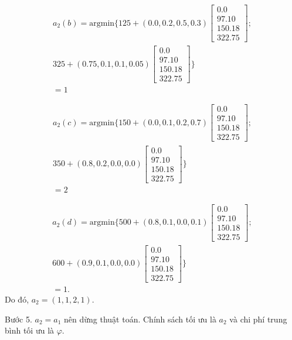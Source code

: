 \documentclass[12pt,a4paper]{report}
\begin{document}
\begin{align*}
a_2(b)=\mathrm{argmin}\{125+(0.0,0.2, 0.5,0.3)
\left[
\begin{array}{c}
0.0\\
97.10\\
150.18\\
322.75
\end{array}
\right];\\
325+(0.75,0.1,0.1,0.05)
\left[
\begin{array}{c}
0.0\\
97.10\\
150.18\\
322.75
\end{array}
\right]\}\\
=1
\end{align*}

\begin{align*}
a_2(c)=\mathrm{argmin}\{150+(0.0,0.1, 0.2,0.7)
\left[
\begin{array}{c}
0.0\\
97.10\\
150.18\\
322.75
\end{array}
\right];\\
350+(0.8,0.2,0.0,0.0)
\left[
\begin{array}{c}
0.0\\
97.10\\
150.18\\
322.75
\end{array}
\right]\}\\
=2
\end{align*}

\begin{align*}
a_2(d)=\mathrm{argmin}\{500+(0.8,0.1, 0.0,0.1)
\left[
\begin{array}{c}
0.0\\
97.10\\
150.18\\
322.75
\end{array}
\right];\\
600+(0.9,0.1,0.0,0.0)
\left[
\begin{array}{c}
0.0\\
97.10\\
150.18\\
322.75
\end{array}
\right]\}\\
=1.
\end{align*}
Do đó, $a_2=(1,1,2,1)$.

\medskip
\noindent
Bước 5. $a_2=a_1$ nên dừng thuật toán. Chính sách tối ưu là $a_2$ và chi phí trung bình tối ưu là $\varphi$.
\end{document}
